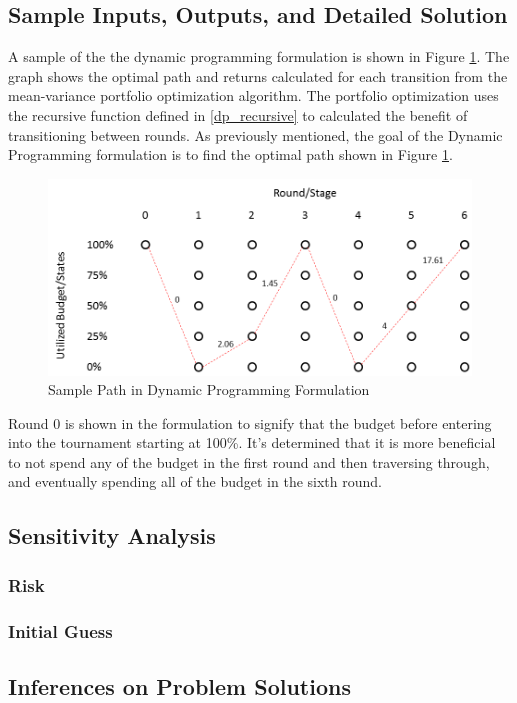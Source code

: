\documentclass[12pt]{article}
\begin{document}
\subsection{Sample Inputs, Outputs, and Detailed Solution}
A sample of the the dynamic programming formulation is shown in Figure \ref{sampleDP}.
The graph shows the optimal path and returns calculated for each transition from the mean-variance portfolio optimization algorithm.
The portfolio optimization uses the recursive function defined in \eqref{dp_recursive} to calculated the benefit of transitioning between rounds.
As previously mentioned, the goal of the Dynamic Programming formulation is to find the optimal path shown in Figure \ref{sampleDP}.
\begin{figure}[H]
\centering
	\includegraphics[scale=.5]{sampleDP.png}%
	\caption{Sample Path in Dynamic Programming Formulation}
	\label{sampleDP}
\end{figure}
Round 0 is shown in the formulation to signify that the budget before entering into the tournament starting at 100\%.
It's determined that it is more beneficial to not spend any of the budget in the first round and then traversing through, and eventually spending all of the budget in the sixth round.

\subsection{Sensitivity Analysis}
\subsubsection{Risk}

\subsubsection{Initial Guess}

\subsection{Inferences on Problem Solutions}
\end{document}
